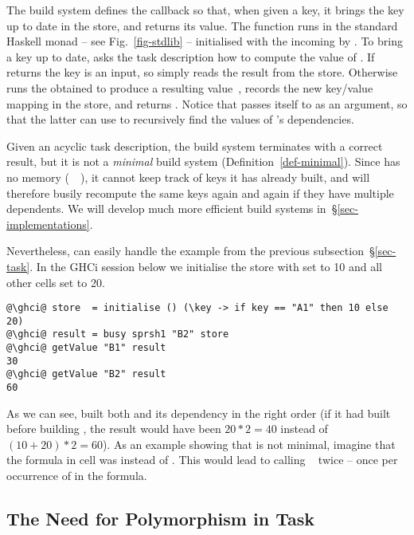 \noindent
The  build system defines the callback  so that, when given a
key, it brings the key up to date in the store, and returns its value.
The function  runs in the standard Haskell  monad -- see
Fig.~\ref{fig-stdlib} -- initialised with the incoming  by .
To bring a key up to date,  asks the task description  how
to compute the value of . If  returns  the key is an
input, so  simply reads the result from the store. Otherwise 
runs the obtained  to produce a resulting value~, records the new
key/value mapping in the store, and returns . Notice that 
passes itself to  as an argument, so that the latter can use 
to recursively find the values of 's dependencies.

Given an acyclic task description, the  build system terminates with a
correct result, but it is not a \emph{minimal} build system
(Definition~\ref{def-minimal}). Since  has no memory
(~\hs{=}~\hs{()}), it cannot keep track of keys it has already built, and
will therefore busily recompute the same keys again and again if they have
multiple dependents. We will develop much more efficient build systems
in~\S\ref{sec-implementations}.

Nevertheless,  can easily handle the example 
from the previous subsection~\S\ref{sec-task}. In the GHCi session below we
initialise the store with  set to 10 and all other cells set to 20.

\begin{verbatim}
@\ghci@ store  = initialise () (\key -> if key == "A1" then 10 else 20)
@\ghci@ result = busy sprsh1 "B2" store
@\ghci@ getValue "B1" result
30
@\ghci@ getValue "B2" result
60
\end{verbatim}

\noindent
As we can see,  built both  and its dependency  in the
right order (if it had built  before building , the result would
have been $20 * 2 = 40$ instead of $(10 + 20) * 2 = 60$). As an example showing
that  is not minimal, imagine that the formula in cell  was
 instead of . This would lead to calling
~ twice -- once per occurrence of  in the
formula.

\subsection{The Need for Polymorphism in Task}\label{sec-why-polymorphism}


